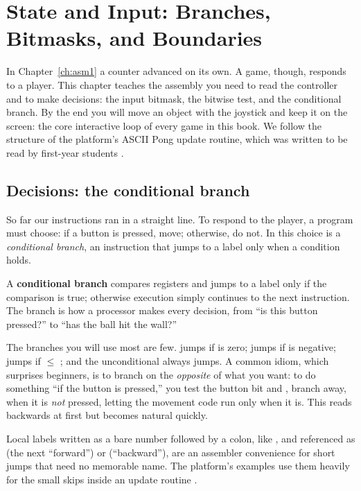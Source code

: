 \chapter{State and Input: Branches, Bitmasks, and Boundaries}
\label{ch:asm2}

In Chapter~\ref{ch:asm1} a counter advanced on its own. A game, though, responds
to a player. This chapter teaches the assembly you need to read the controller
and to make decisions: the input bitmask, the bitwise  test, and the
conditional branch. By the end you will move an object with the joystick and keep
it on the screen: the core interactive loop of every game in this book. We follow
the structure of the platform's ASCII Pong update routine, which was written to be
read by first-year students \citep{prg32tutorialascii,prg32repo}.

\section{Decisions: the conditional branch}

So far our instructions ran in a straight line. To respond to the player, a
program must choose: if a button is pressed, move; otherwise, do not. In \riscv
this choice is a \emph{conditional branch}, an instruction that jumps to a label
only when a condition holds.

\begin{prgconcept}
A \textbf{conditional branch} compares registers and jumps to a label only if the
comparison is true; otherwise execution simply continues to the next instruction.
The branch is how a processor makes every decision, from ``is this button
pressed?'' to ``has the ball hit the wall?''
\end{prgconcept}

The branches you will use most are few.  jumps if  is
zero;  jumps if  is negative; 
jumps if  $\le$ ; and the unconditional  always jumps.
A common idiom, which surprises beginners, is to branch on the \emph{opposite} of
what you want: to do something ``if the button is pressed,'' you test the button
bit and , branch away, when it is \emph{not} pressed, letting the
movement code run only when it is. This reads backwards at first but becomes
natural quickly.

\begin{prgaside}
Local labels written as a bare number followed by a colon, like , and
referenced as  (the next  ``forward'') or  (``backward''),
are an assembler convenience for short jumps that need no memorable name. The
platform's examples use them heavily for the small skips inside an update routine
\citep{prg32repo}.
\end{prgaside}

